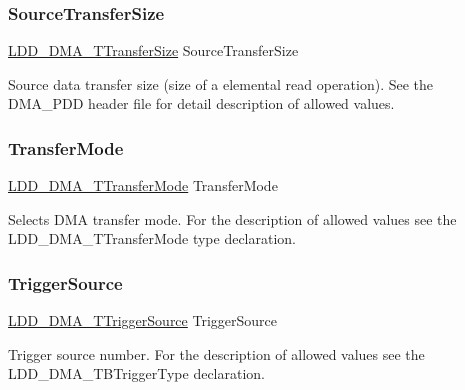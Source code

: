 \subsubsection{\texorpdfstring{Source\+Transfer\+Size}{SourceTransferSize}}
{\footnotesize\ttfamily \hyperlink{group___p_e___types__module_ga868f08f9448e5df27a38314f0893d84a}{L\+D\+D\+\_\+\+D\+M\+A\+\_\+\+T\+Transfer\+Size} Source\+Transfer\+Size}

Source data transfer size (size of a elemental read operation). See the D\+M\+A\+\_\+\+P\+DD header file for detail description of allowed values. \mbox{\label{struct_l_d_d___d_m_a___t_transfer_descriptor_ad041d06753542859536a4d7d98e4e410}} 
\subsubsection{\texorpdfstring{Transfer\+Mode}{TransferMode}}
{\footnotesize\ttfamily \hyperlink{group___p_e___types__module_gacd7d4c29cfce815e9e44755c0153f31b}{L\+D\+D\+\_\+\+D\+M\+A\+\_\+\+T\+Transfer\+Mode} Transfer\+Mode}

Selects D\+MA transfer mode. For the description of allowed values see the L\+D\+D\+\_\+\+D\+M\+A\+\_\+\+T\+Transfer\+Mode type declaration. \mbox{\label{struct_l_d_d___d_m_a___t_transfer_descriptor_a3d3f65eff6c5d9ed22879332bd23c7a6}} 
\subsubsection{\texorpdfstring{Trigger\+Source}{TriggerSource}}
{\footnotesize\ttfamily \hyperlink{group___p_e___types__module_ga8af21cbad27c8d061a98924a11fc5a9b}{L\+D\+D\+\_\+\+D\+M\+A\+\_\+\+T\+Trigger\+Source} Trigger\+Source}

Trigger source number. For the description of allowed values see the L\+D\+D\+\_\+\+D\+M\+A\+\_\+\+T\+B\+Trigger\+Type declaration. \mbox{\label{struct_l_d_d___d_m_a___t_transfer_descriptor_a7ae73456c136555f37c61c84b801a3de}} 
